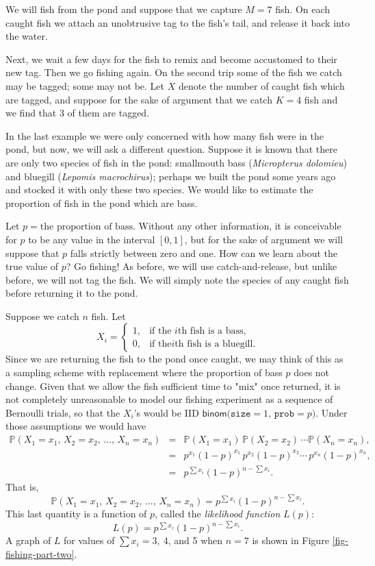 We will fish from the pond and suppose that we capture \(M=7\)
fish. On each caught fish we attach an unobtrusive tag to the fish's
tail, and release it back into the water.

Next, we wait a few days for the fish to remix and become accustomed
to their new tag. Then we go fishing again. On the second trip some of
the fish we catch may be tagged; some may not be. Let \(X\) denote the
number of caught fish which are tagged, and suppose
for the sake of argument that we catch \(K=4\) fish and we find that 3
of them are tagged.

\label{exa-bass-bluegill} In the last example we were only concerned with
how many fish were in the pond, but now, we will ask a different
question. Suppose it is known that there are only two species of fish
in the pond: smallmouth bass (\emph{Micropterus dolomieu}) and bluegill
(\emph{Lepomis macrochirus}); perhaps we built the pond some years ago and
stocked it with only these two species. We would like to estimate the
proportion of fish in the pond which are bass.

Let \(p=\mbox{the proportion of bass}\). Without any other
information, it is conceivable for \(p\) to be any value in the
interval \([0,1]\), but for the sake of argument we will suppose that
\(p\) falls strictly between zero and one. How can we learn about the
true value of \(p\)? Go fishing! As before, we will use
catch-and-release, but unlike before, we will not tag the fish. We
will simply note the species of any caught fish before returning it to
the pond.

Suppose we catch \(n\) fish. Let \[ X_{i} = \begin{cases} 1, &
\mbox{if the \(i\mathrm{th}\) fish is a bass,}\\ 0, & \mbox{if the
\(i\mathrm{th}\) fish is a bluegill.} \end{cases} \] Since we are
returning the fish to the pond once caught, we may think of this as a
sampling scheme with replacement where the proportion of bass \(p\)
does not change. Given that we allow the fish sufficient time to "mix"
once returned, it is not completely unreasonable to model our fishing
experiment as a sequence of Bernoulli trials, so that the \(X_{i}\)'s
would be IID
\(\mathsf{binom(\mathtt{size}}=1,\,\mathtt{prob}=p)\). Under those
assumptions we would have
\begin{eqnarray*}
\mathbb{P}(X_{1}=x_{1},\, X_{2}=x_{2},\,\ldots,\, X_{n}=x_{n}) & = & \mathbb{P}(X_{1}=x_{1})\,\mathbb{P}(X_{2}=x_{2})\,\cdots\mathbb{P}(X_{n}=x_{n}),\\
 & = & p^{x_{1}}(1-p)^{x_{1}}\, p^{x_{2}}(1-p)^{x_{2}}\cdots\, p^{x_{n}}(1-p)^{x_{n}},\\
 & = & p^{\sum x_{i}}(1-p)^{n-\sum x_{i}}.
\end{eqnarray*}
That is, \[ \mathbb{P}(X_{1}=x_{1},\, X_{2}=x_{2},\,\ldots,\,
X_{n}=x_{n})=p^{\sum x_{i}}(1-p)^{n-\sum x_{i}}.  \] This last
quantity is a function of \(p\), called the \emph{likelihood function}
\(L(p)\): \[ L(p)=p^{\sum x_{i}}(1-p)^{n-\sum x_{i}}.  \] A graph of
\(L\) for values of \(\sum x_{i}=3,\ 4\), and 5 when \(n=7\) is shown
in Figure \ref{fig-fishing-part-two}.

